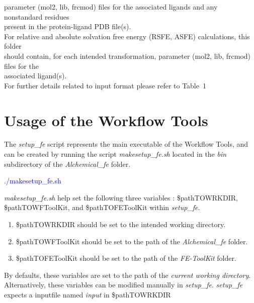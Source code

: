 \documentclass[11pt,letterpaper,titlepage]{article}
\begin{document}
\begin{enumerate}
\begin{itemize}
				parameter (mol2, lib, frcmod) files for the associated ligands and any nonstandard residues  \\
				present in the protein-ligand PDB file(s).  \\
				For relative and absolute solvation free energy (RSFE, ASFE) calculations, this folder \\
				should contain, for each intended transformation, parameter (mol2, lib, frcmod) files for the  \\
				associated ligand(s). \\
				For further details related to input format please refer to Table~1 \\
		\end{itemize}
\end{enumerate}

\vspace{0.1cm}
\section{Usage of the Workflow Tools}
\vspace{0.1cm}

The \textit{setup\_fe} script represents the main executable of the Workflow Tools, 
and can be 
created by running the script \textit{makesetup\_fe.sh} located in the \textit{bin} subdirectory
of the \textit{Alchemical\_fe} folder. 

\vspace{0.1cm}
\centerline{\textcolor{blue}{./makesetup\_fe.sh}}
\vspace{0.1cm}

\textit{makesetup\_fe.sh} help set the following three variables : \${pathTOWRKDIR}, 
\${pathTOWFToolKit}, and \${pathTOFEToolKit} within \textit{setup\_fe}. 
\begin{enumerate}
	\item{\${pathTOWRKDIR} should be set to the intended working directory.}
	\item{\${pathTOWFToolKit} should be set to the path of the \textit{Alchemical\_fe} folder.}
	\item{\${pathTOFEToolKit} should be set to the path of the \textit{FE-ToolKit} folder.}
\end{enumerate}
By defaults, these variables are set to the path of the \textit{current working directory}. Alternatively, these variables 
can be modified manually in \textit{setup\_fe}. 
\textit{setup\_fe} expects a inputfile named \textit{input} in \${pathTOWRKDIR}
\end{document}
